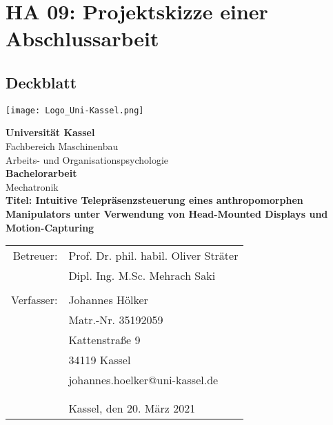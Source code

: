 \section{HA 09: Projektskizze einer Abschlussarbeit}
\subsection{Deckblatt}
\texttt{[image: Logo\_Uni-Kassel.png]}\vspace{50pt}
\begin{center}
\textbf{Universität Kassel}\\
Fachbereich Maschinenbau\\
Arbeits- und Organisationspsychologie\\\vspace{50pt}
\textbf{Bachelorarbeit}\\
Mechatronik\\\vspace{20pt}
\textbf{Titel: Intuitive Telepräsenzsteuerung eines anthropomorphen Manipulators unter Verwendung von Head-Mounted Displays und Motion-Capturing}\\\vspace{30pt}
\begin{tabular}{rl}
Betreuer: & Prof. Dr. phil. habil. Oliver Sträter\\
 & Dipl. Ing. M.Sc. Mehrach Saki \\
  & \\
Verfasser: & Johannes Hölker\\
 & Matr.-Nr. 35192059\\
 & Kattenstraße 9\\
 & 34119 Kassel\\
 & johannes.hoelker@uni-kassel.de\\\vspace{40pt}
 & \\
 & \\
 & Kassel, den 20. März 2021\\
\end{tabular}
\end{center}
